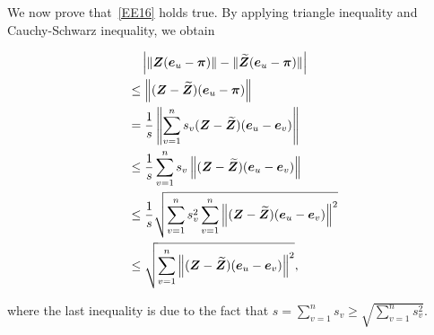 \documentclass[10pt,journal,compsoc,twocolumn,twoside]{IEEEtran}
\begin{document}
\begin{IEEEproof}
    We now prove that~\eqref{EE16} holds true.  By applying triangle inequality and Cauchy-Schwarz inequality, we obtain
    \begin{small}
        \begin{align*}
             & \quad \left|\left\Vert\boldsymbol{Z}(\boldsymbol{e}_u-\boldsymbol{\pi})\right\Vert-\|\widetilde{\boldsymbol{Z}}(\boldsymbol{e}_u-\boldsymbol{\pi})\| \right|                                 \\
             & \le \left\Vert(\boldsymbol{Z}-\widetilde{\boldsymbol{Z}})(\boldsymbol{e}_u-\boldsymbol{\pi})\right\Vert                                                           \\
             & = \frac{1}{s} \left\Vert\sum_{v=1}^{n} s_v (\boldsymbol{Z}-\widetilde{\boldsymbol{Z}})(\boldsymbol{e}_u-\boldsymbol{e}_v)\right\Vert                             \\
             & \le \frac{1}{s} \sum_{v=1}^{n} s_v \left\Vert(\boldsymbol{Z}-\widetilde{\boldsymbol{Z}})(\boldsymbol{e}_u-\boldsymbol{e}_v)\right\Vert                           \\
             & \le \frac{1}{s} \sqrt{\sum_{v=1}^{n} s_v^2 \sum_{v=1}^{n} \left\Vert(\boldsymbol{Z}-\widetilde{\boldsymbol{Z}})(\boldsymbol{e}_u-\boldsymbol{e}_v)\right\Vert^2} \\
             & \le \sqrt{\sum_{v=1}^{n} \left\Vert(\boldsymbol{Z}-\widetilde{\boldsymbol{Z}})(\boldsymbol{e}_u-\boldsymbol{e}_v)\right\Vert^2},
        \end{align*}
    \end{small}
    where the last inequality is due to the fact that \(s=\sum_{v=1}^{n} s_v\ge \sqrt{\sum_{v=1}^{n} s_v^2}\).


\end{IEEEproof}
\end{document}

